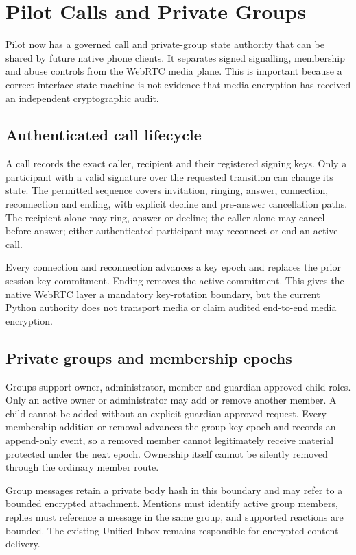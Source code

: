 \section{Pilot Calls and Private Groups}
\label{sec:pilot-mobile-calls-groups}

Pilot now has a governed call and private-group state authority that can be shared by
future native phone clients.  It separates signed signalling, membership and abuse
controls from the WebRTC media plane.  This is important because a correct interface
state machine is not evidence that media encryption has received an independent
cryptographic audit.

\subsection{Authenticated call lifecycle}

A call records the exact caller, recipient and their registered signing keys.  Only
a participant with a valid signature over the requested transition can change its
state.  The permitted sequence covers invitation, ringing, answer, connection,
reconnection and ending, with explicit decline and pre-answer cancellation paths.
The recipient alone may ring, answer or decline; the caller alone may cancel before
answer; either authenticated participant may reconnect or end an active call.

Every connection and reconnection advances a key epoch and replaces the prior
session-key commitment.  Ending removes the active commitment.  This gives the
native WebRTC layer a mandatory key-rotation boundary, but the current Python
authority does not transport media or claim audited end-to-end media encryption.

\subsection{Private groups and membership epochs}

Groups support owner, administrator, member and guardian-approved child roles.
Only an active owner or administrator may add or remove another member.  A child
cannot be added without an explicit guardian-approved request.  Every membership
addition or removal advances the group key epoch and records an append-only event,
so a removed member cannot legitimately receive material protected under the next
epoch.  Ownership itself cannot be silently removed through the ordinary member
route.

Group messages retain a private body hash in this boundary and may refer to a
bounded encrypted attachment.  Mentions must identify active group members, replies
must reference a message in the same group, and supported reactions are bounded.
The existing Unified Inbox remains responsible for encrypted content delivery.

